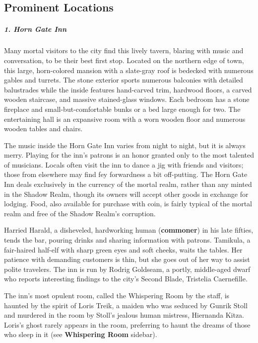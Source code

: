 \documentclass[10pt,a4paper,twoside,bg=print,twocolumn,openany,nodeprecatedcode]{dndbook}
\begin{document}
\subsection{Prominent Locations}
\subparagraph{1. Horn Gate Inn}
Many mortal visitors to the city find this lively tavern, blaring with music and conversation, to be their best first stop. Located on the northern edge of town, this large, horn-colored mansion with a slate-gray roof is bedecked with numerous gables and turrets. The stone exterior sports numerous balconies with detailed balustrades while the inside features hand-carved trim, hardwood floors, a carved wooden staircase, and massive stained-glass windows. Each bedroom has a stone fireplace and small-but-comfortable bunks or a bed large enough for two. The entertaining hall is an expansive room with a worn wooden floor and numerous wooden tables and chairs.

The music inside the Horn Gate Inn varies from night to night, but it is always merry. Playing for the inn's patrons is an honor granted only to the most talented of musicians. Locals often visit the inn to dance a jig with friends and visitors; those from elsewhere may find fey forwardness a bit off-putting. The Horn Gate Inn deals exclusively in the currency of the mortal realm, rather than any minted in the Shadow Realm, though its owners will accept other goods in exchange for lodging. Food, also available for purchase with coin, is fairly typical of the mortal realm and free of the Shadow Realm's corruption.

Harried Harald, a disheveled, hardworking human (\textbf{commoner}) in his late fifties, tends the bar, pouring drinks and sharing information with patrons. Tamikula, a fair-haired half-elf with sharp green eyes and soft cheeks, waits the tables. Her patience with demanding customers is thin, but she goes out of her way to assist polite travelers. The inn is run by Rodrig Goldseam, a portly, middle-aged dwarf who reports interesting findings to the city's Second Blade, Tristelia Caernefille.

The inn's most opulent room, called the Whispering Room by the staff, is haunted by the spirit of Loris Treik, a maiden who was seduced by Gunrik Stoll and murdered in the room by Stoll's jealous human mistress, Hiernanda Kitza. Loris's ghost rarely appears in the room, preferring to haunt the dreams of those who sleep in it (see \textbf{Whispering Room} sidebar).
\end{document}

